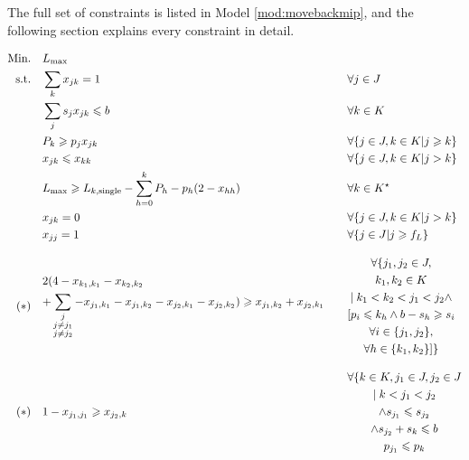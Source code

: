 \documentclass[13pt, letterpaper, oneside]{book}
\begin{document}
The full set of constraints is listed in Model \ref{mod:movebackmip}, and the
following section explains every constraint in detail.
\begin{model}
\begin{alignat}{2}
\text{Min.}\quad & \Lmax && \\
\text{s.t.}\quad & \label{mbm:eq7}\sum_{k} x_{jk} = 1 \quad && \forall j \in J \\
& \label{mbm:eq6}\sum_{j} s_j x_{jk} \leq b \quad && \forall k \in K \\
&\label{mbm:eq3} P_k \geq p_j x_{jk} \quad && \forall \{j \in J, k \in K | j \geq k\} \\
&\label{mbm:eq5} x_{jk} \leq x_{kk} \quad && \forall \{j \in J, k \in K | j > k\} \\
&\label{mbm:eq4} \Lmax \geq L_{k,\text{single}} - \sum_{h=0}^{k} P_h - p_h(2 -
x_{hh}) \quad && \forall k \in K^\star \\
\label{mbm:eq1} & x_{jk} = 0 \quad && \forall \{j \in J, k \in K | j > k\} \\
&\label{mbm:eq2} x_{jj} = 1 \quad && \forall \{j \in J | j \geq f_L\} \\[2ex]
(*)\quad & \label{mbm:eq8}\begin{gathered} 2(  4 - x_{k_1,k_1} - x_{k_2,k_2} \hfill \\+ \sum_{\substack{{j}\\{j \neq j_1}\\{j \neq
j_2}}} - x_{j_1,k_1} - x_{j_1,k_2} -
x_{j_2,k_1} - x_{j_2,k_2} ) \geq x_{j_1,k_2} + x_{j_2,k_1} \end{gathered}
\quad && \begin{gathered} \forall\{ j_1, j_2 \in J, \\ k_1, k_2 \in K \\|\; k_1 < k_2 <
j_1 < j_2 \land \\ [p_i \leq k_h \land b - s_h \geq s_i\\ \forall i \in
\{j_1,j_2\}, \\ \forall h
\in \{k_1,k_2\}] \} \end{gathered} \\[2ex]
(*)\quad & \label{mbm:eq9}1-x_{j_1,j_1} \geq x_{j_2,k} \quad && \begin{gathered} \forall \{k \in K,
j_1 \in J, j_2 \in J \\|\; k < j_1 < j_2 \\ \land s_{j_1} \leq s_{j_2} \\
\land s_{j_2} + s_k \leq b \\ p_{j_1} \leq p_k 

\end{gathered}
\end{alignat}
\end{model}
\end{document}
